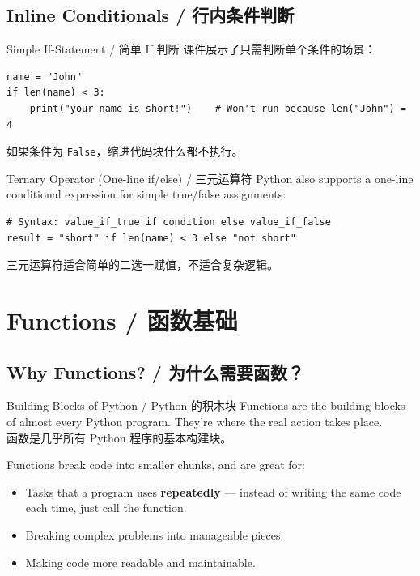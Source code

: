 \documentclass[11pt,a4paper]{report}
\let\oldtexttt\texttt
\renewcommand{\texttt}[1]{\textcolor{mainblue}{\oldtexttt{#1}}}
\begin{document}
\subsection{Inline Conditionals / 行内条件判断}

\begin{examplebox}{Simple If-Statement / 简单 If 判断}
    课件展示了只需判断单个条件的场景：
\begin{lstlisting}
name = "John"
if len(name) < 3:
    print("your name is short!")    # Won't run because len("John") = 4
\end{lstlisting}
    如果条件为 \texttt{False}，缩进代码块什么都不执行。
\end{examplebox}

\begin{concept}{Ternary Operator (One-line if/else) / 三元运算符}
    Python also supports a one-line conditional expression for simple true/false assignments:
\begin{lstlisting}
# Syntax: value_if_true if condition else value_if_false
result = "short" if len(name) < 3 else "not short"
\end{lstlisting}
    三元运算符适合简单的二选一赋值，不适合复杂逻辑。
\end{concept}

\section{Functions / 函数基础}

\subsection{Why Functions? / 为什么需要函数？}

\begin{concept}{Building Blocks of Python / Python 的积木块}
    Functions are the building blocks of almost every Python program. They're where the real action takes place. \\
    函数是几乎所有 Python 程序的基本构建块。

    Functions break code into smaller chunks, and are great for:
    \begin{itemize}[itemsep=0.3em]
        \item Tasks that a program uses \textbf{repeatedly} — instead of writing the same code each time, just call the function.
        \item Breaking complex problems into manageable pieces.
        \item Making code more readable and maintainable.
    \end{itemize}
\end{concept}
\end{document}
